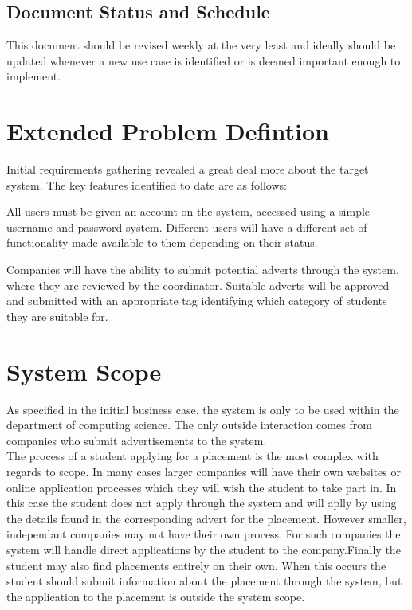 \documentclass{l3deliverable}
\begin{document}
\subsection{Document Status and Schedule}
This document should be revised weekly at the very least and ideally should be updated whenever a new use case is identified or is deemed important enough to implement.


\section{Extended Problem Defintion}
Initial requirements gathering revealed a great deal more about the target system. The key features identified to date are as follows:
\begin{itemize}
\item{All users must be given an account on the system, accessed using a simple username and password system. Different users will have a different set of functionality made 
available to them depending on their status.
\item{Companies will have the ability to submit potential adverts through the system, where they are reviewed by the coordinator. Suitable adverts will be approved and submitted
with an appropriate tag identifying which category of students they are suitable for.}
\item
\section{System Scope}
As specified in the initial business case, the system is only to be used within the department of computing science. The only outside interaction comes from companies who
submit advertisements to the system. \\
The process of a student applying for a placement is the most complex with regards to scope. In many cases larger companies will have their own websites or online application
processes which they will wish the student to take part in. In this case the student does not apply through the system and will aplly by using the details found in the corresponding
advert for the placement. However smaller, independant companies may not have their own process. For such companies the system will handle direct applications by the student to 
the company.Finally the student may also find placements entirely on their own. When this occurs the student should submit information about the placement through the system, but
the application to the placement is outside the system scope.
\\

}
\end{itemize}
\end{document}

